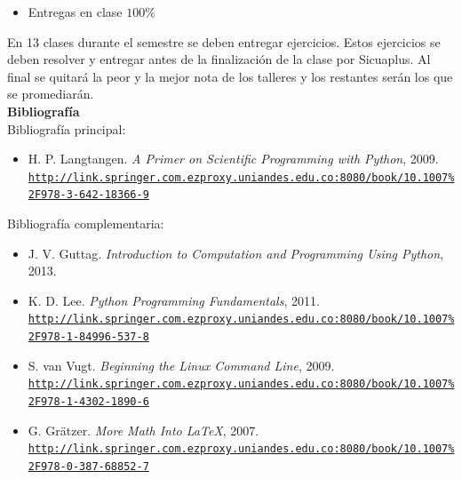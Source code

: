 \documentclass[letterpaper,10pt,onecolumn]{article}
\begin{document}
\begin{itemize}
	\item Entregas en clase $100\%$
\end{itemize}
\noindent\normalsize En 13 clases durante el semestre se deben
entregar ejercicios. 
Estos ejercicios se deben resolver y entregar antes de la
finalizaci\'on de la clase por Sicuaplus.
Al final se quitar\'a la peor y la mejor nota de los talleres y los
restantes ser\'an los que se promediar\'an. 
\\[0.1cm] 

\noindent\textbf{\large {} \quad Bibliografía}\\[-0.2cm]

\noindent\normalsize Bibliografía principal:


\begin{itemize}
	\item H. P. Langtangen. \textit{A Primer on Scientific Programming with Python}, 2009.\\
	\href{http://link.springer.com.ezproxy.uniandes.edu.co:8080/book/10.1007\%2F978-3-642-18366-9}{\nolinkurl{http://link.springer.com.ezproxy.uniandes.edu.co:8080/book/10.1007\%2F978-3-642-18366-9}}\\[-0.6cm]
\end{itemize}

\noindent\normalsize Bibliografía complementaria:

\begin{itemize}
	\item J. V. Guttag. \textit{Introduction to Computation and Programming Using Python}, 2013.
	\item K. D. Lee. \textit{Python Programming Fundamentals}, 2011. \\
	\href{http://link.springer.com.ezproxy.uniandes.edu.co:8080/book/10.1007\%2F978-1-84996-537-8}{\nolinkurl{http://link.springer.com.ezproxy.uniandes.edu.co:8080/book/10.1007\%2F978-1-84996-537-8}}\\[-0.6cm]
	\item S. van Vugt. \textit{Beginning the Linux Command Line}, 2009.\\
	\href{http://link.springer.com.ezproxy.uniandes.edu.co:8080/book/10.1007\%2F978-1-4302-1890-6}{\nolinkurl{http://link.springer.com.ezproxy.uniandes.edu.co:8080/book/10.1007\%2F978-1-4302-1890-6}}\\[-0.6cm]
	\item G. Gr\"atzer. \textit{More Math Into  \LaTeX}, 2007.\\
	\href{http://link.springer.com.ezproxy.uniandes.edu.co:8080/book/10.1007\%2F978-0-387-68852-7}{\nolinkurl{http://link.springer.com.ezproxy.uniandes.edu.co:8080/book/10.1007\%2F978-0-387-68852-7}}
\end{itemize}
\end{document}
